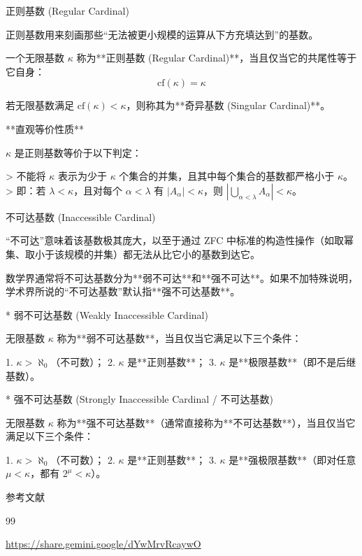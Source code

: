 \documentclass{beamer}
\begin{document}
\begin{frame}[fragile]{正则基数 (Regular Cardinal)}
\begin{markdown}
正则基数用来刻画那些“无法被更小规模的运算从下方充填达到”的基数。

一个无限基数 $\kappa$ 称为**正则基数 (Regular Cardinal)**，当且仅当它的共尾性等于它自身：
$$\text{cf}(\kappa) = \kappa$$

若无限基数满足 $\text{cf}(\kappa) < \kappa$，则称其为**奇异基数 (Singular Cardinal)**。

\medskip
**直观等价性质**

$\kappa$ 是正则基数等价于以下判定：

> 不能将 $\kappa$ 表示为少于 $\kappa$ 个集合的并集，且其中每个集合的基数都严格小于 $\kappa$。
> 即：若 $\lambda < \kappa$，且对每个 $\alpha < \lambda$ 有 $\vert{}A_\alpha\vert{} < \kappa$，则 $\left\vert{} \bigcup_{\alpha < \lambda} A_\alpha \right\vert{} < \kappa$。
\end{markdown}
\end{frame}

\begin{frame}[fragile]{不可达基数 (Inaccessible Cardinal)}
\begin{markdown}
“不可达”意味着该基数极其庞大，以至于通过 ZFC 中标准的构造性操作（如取幂集、取小于该规模的并集）都无法从比它小的基数到达它。

数学界通常将不可达基数分为**弱不可达**和**强不可达**。如果不加特殊说明，学术界所说的“不可达基数”默认指**强不可达基数**。

* 弱不可达基数 (Weakly Inaccessible Cardinal)

无限基数 $\kappa$ 称为**弱不可达基数**，当且仅当它满足以下三个条件：

1. $\kappa > \aleph_0$（不可数）；
2. $\kappa$ 是**正则基数**；
3. $\kappa$ 是**极限基数**（即不是后继基数）。

* 强不可达基数 (Strongly Inaccessible Cardinal / 不可达基数)

无限基数 $\kappa$ 称为**强不可达基数**（通常直接称为**不可达基数**），当且仅当它满足以下三个条件：

1. $\kappa > \aleph_0$（不可数）；
2. $\kappa$ 是**正则基数**；
3. $\kappa$ 是**强极限基数**（即对任意 $\mu < \kappa$，都有 $2^\mu < \kappa$）。

\end{markdown}
\end{frame}


\begin{frame}[allowframebreaks]{参考文献}
\begin{thebibliography}{99}

\url{https://share.gemini.google/dYwMrvRcaywO}

\end{thebibliography}
\end{frame}
\end{document}
